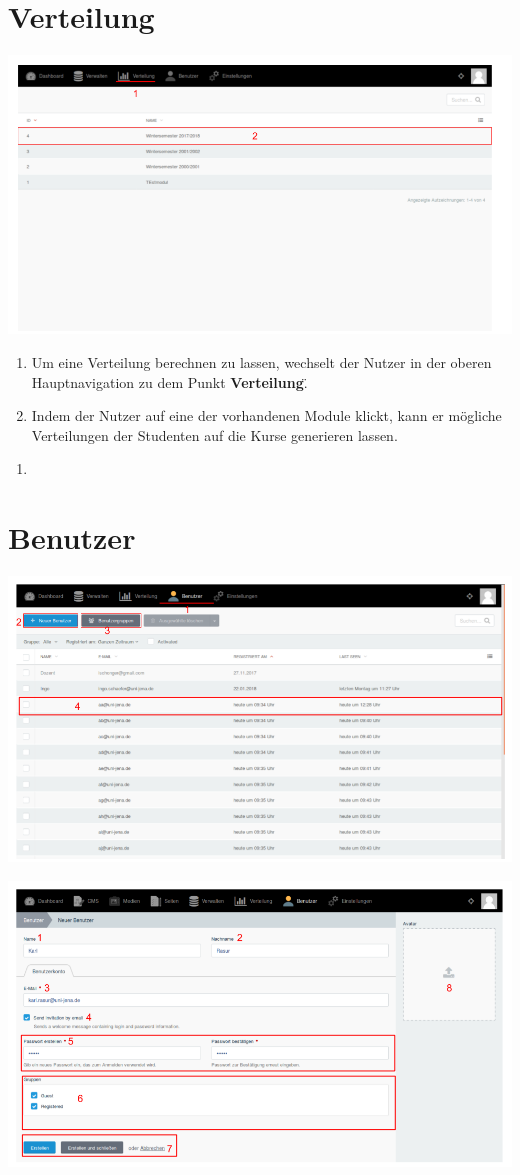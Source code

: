   
  \section{Verteilung}
  \label{section:distribution}
  
  \includegraphics[scale=0.3]{backend/img/distribution_1.png}
  
  \begin{enumerate}
   \item Um eine Verteilung berechnen zu lassen, wechselt der Nutzer in der oberen Hauptnavigation zu dem Punkt \"\textbf{Verteilung}\".
   \item Indem der Nutzer auf eine der vorhandenen Module klickt, kann er mögliche Verteilungen der Studenten auf die Kurse generieren lassen.
  \end{enumerate}
  
  \begin{enumerate}
   \item 
  \end{enumerate}

  
  \section{Benutzer}
  \label{section:users}
  
  \includegraphics[scale=0.3]{backend/img/users_1.png}
  
  \includegraphics[scale=0.3]{backend/img/neuer_benutzer.png}
    